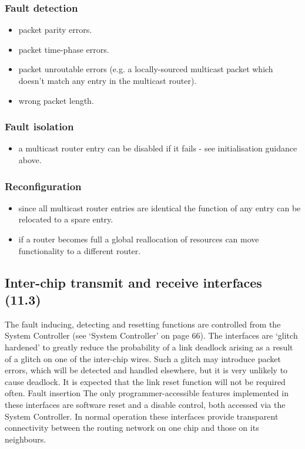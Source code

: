 \documentclass[11pt]{article}
\newenvironment{itmz}{
	\begin{itemize}
		\setlength{\itemsep}{0pt}
		\setlength{\parskip}{0pt}
	}{\end{itemize}}
\begin{document}
\subsubsection*{Fault detection}
\begin{itmz}
\item packet parity errors.
\item packet time-phase errors.
\item packet unroutable errors (e.g. a locally-sourced multicast packet which doesn’t match any entry
in the multicast router).
\item wrong packet length.
\end{itmz}
\subsubsection*{Fault isolation}
\begin{itmz}
\item a multicast router entry can be disabled if it fails - see initialisation guidance above.
\end{itmz}
\subsubsection*{Reconfiguration}
\begin{itmz}
\item since all multicast router entries are identical the function of any entry can be relocated to a spare
entry.
\item if a router becomes full a global reallocation of resources can move functionality to a different
router.
\end{itmz}

\subsection{Inter-chip transmit and receive interfaces (11.3)}
The fault inducing, detecting and resetting functions are controlled from the System Controller (see
`System Controller' on page 66). The interfaces are `glitch hardened' to greatly reduce the
probability of a link deadlock arising as a result of a glitch on one of the inter-chip wires. Such a
glitch may introduce packet errors, which will be detected and handled elsewhere, but it is very
unlikely to cause deadlock. It is expected that the link reset function will not be required often.
Fault insertion
The only programmer-accessible features implemented in these interfaces are software reset and a
disable control, both accessed via the System Controller. In normal operation these interfaces
provide transparent connectivity between the routing network on one chip and those on its
neighbours.
\end{document}
